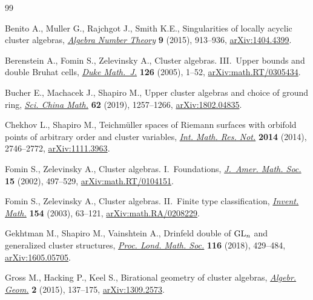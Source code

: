 \documentclass[10pt,a4paper]{amsart}
\numberwithin{equation}{section}
\begin{document}

\begin{thebibliography}{99}
\footnotesize\itemsep=0pt

Benito A., Muller G., Rajchgot J., Smith K.E., Singularities of locally acyclic
 cluster algebras, \href{https://doi.org/10.2140/ant.2015.9.913}{\textit{Algebra Number Theory}} \textbf{9} (2015), 913--936,
 \href{https://arxiv.org/abs/1404.4399}{arXiv:1404.4399}.

Berenstein A., Fomin S., Zelevinsky A., Cluster algebras. {III}.~{U}pper bounds
 and double {B}ruhat cells, \href{https://doi.org/10.1215/S0012-7094-04-12611-9}{\textit{Duke Math.~J.}} \textbf{126} (2005), 1--52,
 \href{https://arxiv.org/abs/math.RT/0305434}{arXiv:math.RT/0305434}.

Bucher E., Machacek J., Shapiro M., Upper cluster algebras and choice of ground
 ring, \href{https://doi.org/10.1007/s11425-018-9486-6}{\textit{Sci. China Math.}} \textbf{62} (2019), 1257--1266,
 \href{https://arxiv.org/abs/1802.04835}{arXiv:1802.04835}.

Chekhov L., Shapiro M., Teichm\"uller spaces of {R}iemann surfaces with
 orbifold points of arbitrary order and cluster variables, \href{https://doi.org/10.1093/imrn/rnt016}{\textit{Int. Math.
 Res. Not.}} \textbf{2014} (2014), 2746--2772, \href{https://arxiv.org/abs/1111.3963}{arXiv:1111.3963}.

Fomin S., Zelevinsky A., Cluster algebras. {I}.~{F}oundations, \href{https://doi.org/10.1090/S0894-0347-01-00385-X}{\textit{J.~Amer.
 Math. Soc.}} \textbf{15} (2002), 497--529, \href{https://arxiv.org/abs/math.RT/0104151}{arXiv:math.RT/0104151}.

Fomin S., Zelevinsky A., Cluster algebras. {II}.~{F}inite type classification,
 \href{https://doi.org/10.1007/s00222-003-0302-y}{\textit{Invent. Math.}} \textbf{154} (2003), 63--121,
 \href{https://arxiv.org/abs/math.RA/0208229}{arXiv:math.RA/0208229}.

Gekhtman M., Shapiro M., Vainshtein A., Drinfeld double of {${\rm GL}_n$} and
 generalized cluster structures, \href{https://doi.org/10.1112/plms.12086}{\textit{Proc. Lond. Math. Soc.}} \textbf{116}
 (2018), 429--484, \href{https://arxiv.org/abs/1605.05705}{arXiv:1605.05705}.

Gross M., Hacking P., Keel S., Birational geometry of cluster algebras,
 \href{https://doi.org/10.14231/AG-2015-007}{\textit{Algebr. Geom.}} \textbf{2} (2015), 137--175, \href{https://arxiv.org/abs/1309.2573}{arXiv:1309.2573}.


\end{thebibliography}
\end{document}
